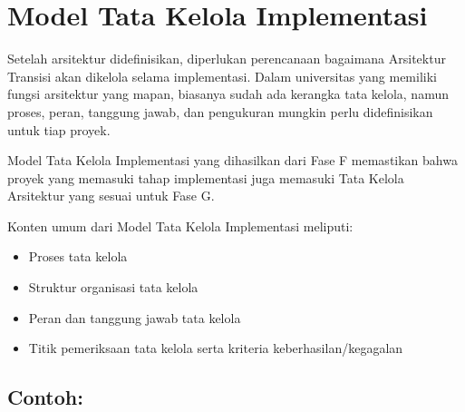 \section{Model Tata Kelola Implementasi}

Setelah arsitektur didefinisikan, diperlukan perencanaan bagaimana Arsitektur Transisi akan dikelola selama implementasi. Dalam universitas yang memiliki fungsi arsitektur yang mapan, biasanya sudah ada kerangka tata kelola, namun proses, peran, tanggung jawab, dan pengukuran mungkin perlu didefinisikan untuk tiap proyek.

Model Tata Kelola Implementasi yang dihasilkan dari Fase F memastikan bahwa proyek yang memasuki tahap implementasi juga memasuki Tata Kelola Arsitektur yang sesuai untuk Fase G.

Konten umum dari Model Tata Kelola Implementasi meliputi:
\begin{itemize}
	\item Proses tata kelola
	\item Struktur organisasi tata kelola
	\item Peran dan tanggung jawab tata kelola
	\item Titik pemeriksaan tata kelola serta kriteria keberhasilan/kegagalan
\end{itemize}

\subsection*{Contoh:}

